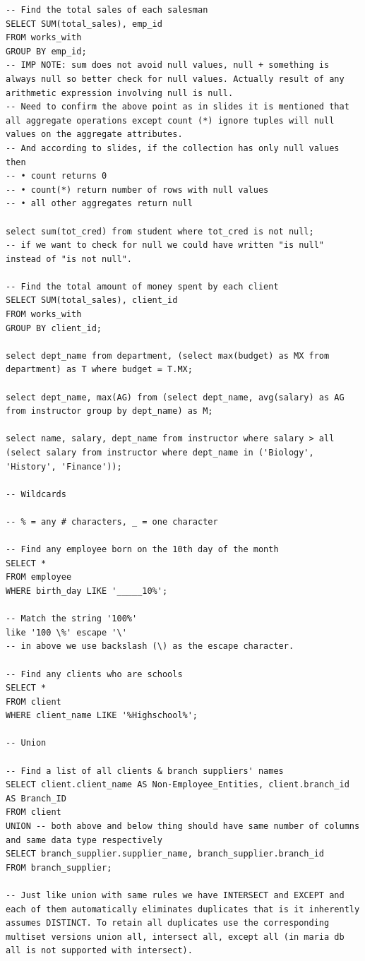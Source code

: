 \documentclass[8pt, a4paper, oneside, twocolumn]{extarticle}
\begin{document}
\begin{verbatim}
-- Find the total sales of each salesman
SELECT SUM(total_sales), emp_id
FROM works_with
GROUP BY emp_id;
-- IMP NOTE: sum does not avoid null values, null + something is always null so better check for null values. Actually result of any arithmetic expression involving null is null.
-- Need to confirm the above point as in slides it is mentioned that all aggregate operations except count (*) ignore tuples will null values on the aggregate attributes.
-- And according to slides, if the collection has only null values then 
-- • count returns 0
-- • count(*) return number of rows with null values
-- • all other aggregates return null

select sum(tot_cred) from student where tot_cred is not null;
-- if we want to check for null we could have written "is null" instead of "is not null".

-- Find the total amount of money spent by each client
SELECT SUM(total_sales), client_id
FROM works_with
GROUP BY client_id;

select dept_name from department, (select max(budget) as MX from department) as T where budget = T.MX;

select dept_name, max(AG) from (select dept_name, avg(salary) as AG from instructor group by dept_name) as M;

select name, salary, dept_name from instructor where salary > all (select salary from instructor where dept_name in ('Biology', 'History', 'Finance'));

-- Wildcards

-- % = any # characters, _ = one character

-- Find any employee born on the 10th day of the month
SELECT *
FROM employee
WHERE birth_day LIKE '_____10%';

-- Match the string '100%'
like '100 \%' escape '\'
-- in above we use backslash (\) as the escape character.

-- Find any clients who are schools
SELECT *
FROM client
WHERE client_name LIKE '%Highschool%';

-- Union 

-- Find a list of all clients & branch suppliers' names
SELECT client.client_name AS Non-Employee_Entities, client.branch_id AS Branch_ID
FROM client
UNION -- both above and below thing should have same number of columns and same data type respectively
SELECT branch_supplier.supplier_name, branch_supplier.branch_id
FROM branch_supplier;

-- Just like union with same rules we have INTERSECT and EXCEPT and each of them automatically eliminates duplicates that is it inherently assumes DISTINCT. To retain all duplicates use the corresponding multiset versions union all, intersect all, except all (in maria db all is not supported with intersect).


\end{verbatim}
\end{document}
